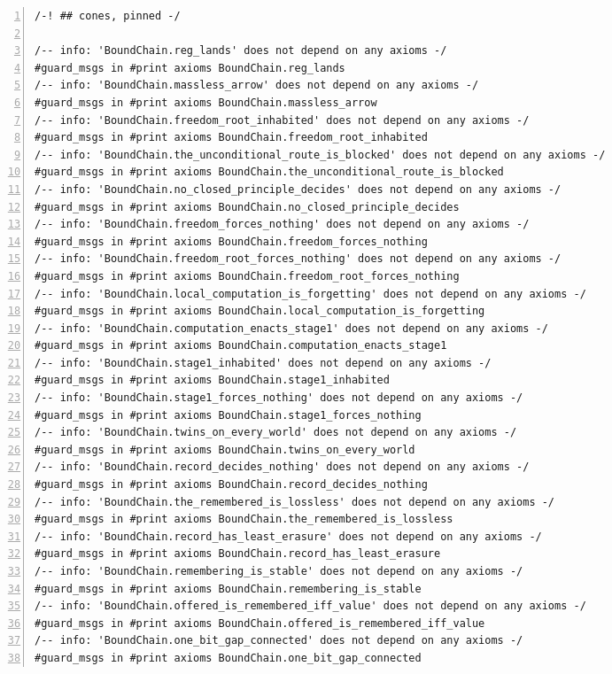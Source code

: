 \documentclass[10pt]{article}
\newcommand{\leansize}{\fontsize{5.5pt}{6.75pt}\selectfont}
\begin{document}
\begin{multicols}{2}
\begin{Verbatim}[numbers=left,firstnumber=1,numbersep=3pt,xleftmargin=2.6em,breaklines=true,breakanywhere=true,breakautoindent=false,breakindent=1.4em,breaksymbolleft={},breakanywheresymbolpre={},fontsize=\leansize]
/-! ## cones, pinned -/

/-- info: 'BoundChain.reg_lands' does not depend on any axioms -/
#guard_msgs in #print axioms BoundChain.reg_lands
/-- info: 'BoundChain.massless_arrow' does not depend on any axioms -/
#guard_msgs in #print axioms BoundChain.massless_arrow
/-- info: 'BoundChain.freedom_root_inhabited' does not depend on any axioms -/
#guard_msgs in #print axioms BoundChain.freedom_root_inhabited
/-- info: 'BoundChain.the_unconditional_route_is_blocked' does not depend on any axioms -/
#guard_msgs in #print axioms BoundChain.the_unconditional_route_is_blocked
/-- info: 'BoundChain.no_closed_principle_decides' does not depend on any axioms -/
#guard_msgs in #print axioms BoundChain.no_closed_principle_decides
/-- info: 'BoundChain.freedom_forces_nothing' does not depend on any axioms -/
#guard_msgs in #print axioms BoundChain.freedom_forces_nothing
/-- info: 'BoundChain.freedom_root_forces_nothing' does not depend on any axioms -/
#guard_msgs in #print axioms BoundChain.freedom_root_forces_nothing
/-- info: 'BoundChain.local_computation_is_forgetting' does not depend on any axioms -/
#guard_msgs in #print axioms BoundChain.local_computation_is_forgetting
/-- info: 'BoundChain.computation_enacts_stage1' does not depend on any axioms -/
#guard_msgs in #print axioms BoundChain.computation_enacts_stage1
/-- info: 'BoundChain.stage1_inhabited' does not depend on any axioms -/
#guard_msgs in #print axioms BoundChain.stage1_inhabited
/-- info: 'BoundChain.stage1_forces_nothing' does not depend on any axioms -/
#guard_msgs in #print axioms BoundChain.stage1_forces_nothing
/-- info: 'BoundChain.twins_on_every_world' does not depend on any axioms -/
#guard_msgs in #print axioms BoundChain.twins_on_every_world
/-- info: 'BoundChain.record_decides_nothing' does not depend on any axioms -/
#guard_msgs in #print axioms BoundChain.record_decides_nothing
/-- info: 'BoundChain.the_remembered_is_lossless' does not depend on any axioms -/
#guard_msgs in #print axioms BoundChain.the_remembered_is_lossless
/-- info: 'BoundChain.record_has_least_erasure' does not depend on any axioms -/
#guard_msgs in #print axioms BoundChain.record_has_least_erasure
/-- info: 'BoundChain.remembering_is_stable' does not depend on any axioms -/
#guard_msgs in #print axioms BoundChain.remembering_is_stable
/-- info: 'BoundChain.offered_is_remembered_iff_value' does not depend on any axioms -/
#guard_msgs in #print axioms BoundChain.offered_is_remembered_iff_value
/-- info: 'BoundChain.one_bit_gap_connected' does not depend on any axioms -/
#guard_msgs in #print axioms BoundChain.one_bit_gap_connected

\end{Verbatim}
\end{multicols}
\end{document}
